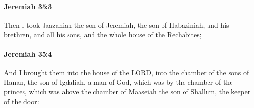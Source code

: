 		\paragraph{Jeremiah 35:3} %
			\label{JEREMIAH-35-3}

			Then I took Jaazaniah the son of Jeremiah, the son of Habaziniah, and his brethren, and all his sons, and the whole house of the Rechabites;


		\paragraph{Jeremiah 35:4} %
			\label{JEREMIAH-35-4}

			And I brought them into the house of the LORD, into the chamber of the sons of Hanan, the son of Igdaliah, a man of God, which was by the chamber of the princes, which was above the chamber of Maaseiah the son of Shallum, the keeper of the door:


